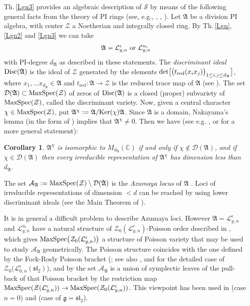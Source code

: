 \documentclass[11pt]{amsart}
\newtheorem{cor}[teo]{Corollary}
\newcommand{\e}{\epsilon}
\newcommand{\mc}{\mathbb{C}}
\newcommand{\Ll}{\mathcal{L}}
\newcommand{\Zz}{\mathcal{Z}}
\begin{document}
Th.\,\ref{Lgn3} provides an algebraic description of $\mathcal{S}$ by means of the following general facts from the theory of PI rings (see, e.g., \cite[Chap.\,13]{MC-R}, \cite[Chap.\,6]{Rowen}, \cite{Artin}). Let $\mathfrak{A}$ be a division PI algebra, with center $\Zz$ a Noetherian and integrally closed ring. By Th.\,\ref{Lgn}, \ref{Lgn2} and \ref{Lgn3} we can take
$$\mathfrak{A} = \Ll_{g,n}^\e\ {\rm or}\ \Ll_{g,n}^{u_\e}$$ with PI-degree $d_\mathfrak{A}$ as described in these statements. The {\it discriminant ideal} ${\rm Disc}(\mathfrak{A})$ is the ideal of $\Zz$ generated by the elements ${\rm det}\bigl[\bigl(t_{\mathrm{red}}(x_ix_j)\bigr)_{1\leq i,j\leq d_\mathfrak{A}}\bigr]$, where $x_1,\ldots x_{d_\mathfrak{A}}\in \mathfrak{A}$ and $t_{\mathrm{red}}: \mathfrak{A} \rightarrow \Zz$ is the reduced trace map of $\mathfrak{A}$ (see \cite[\S 10]{Reiner}). The set $\mathcal{D}(\mathfrak{A}) \subset {\rm MaxSpec}(\Zz)$ of zeros of ${\rm Disc}(\mathfrak{A})$ is a closed (proper) subvariety of ${\rm MaxSpec}(\Zz)$, called the discriminant variety. Now, given a central character $\chi\in {\rm MaxSpec}(\Zz)$, put $\mathfrak{A}^\chi := \mathfrak{A}/{\rm Ker}(\chi)\mathfrak{A}$. Since $\mathfrak{A}$ is a domain, Nakayama's lemma (in the form of \cite[Cor.\,2.5]{AMacD}) implies that $\mathfrak{A}^\chi\ne 0$. Then we have (see e.g. \cite[Lem.\,3.7]{DCK}, or \cite[Th.\,I.13.5]{BG} for a more general statement):
\begin{cor}\label{disAz} $\mathfrak{A}^\chi$ is isomorphic to $M_{d_\mathfrak{A}}(\mc)$ if and only if $\chi\notin \mathcal{D}(\mathfrak{A})$, and if $\chi\in \mathcal{D}(\mathfrak{A})$ then every irreducible representation of $\mathfrak{A}^\chi$ has dimension less than ${d_\mathfrak{A}}$. 
\end{cor} 
The set $\mathcal{A}_{\mathfrak{A}} := {\rm MaxSpec}(\Zz)\setminus \mathcal{D}(\mathfrak{A})$ is the {\it Azumaya locus} of $\mathfrak{A}$ \cite[III.1.6-III.1.7]{BG}. Loci of irreducible representations of dimension $< d$ can be reached by using lower discriminant ideals (see the Main Theorem of \cite{BY}).

It is in general a difficult problem to describe Azumaya loci. However $\mathfrak{A} = \Ll_{g,n}^\e$ and $\Ll_{g,n}^{u_\e}$ have a natural structure of $\mathcal{Z}_0(\Ll_{g,n}^\e)$-Poisson order described in \cite[\S 2.1-2.2]{BrGo}, which gives ${\rm MaxSpec}\bigl(\Zz_0(\Ll_{g,n}^\e)\bigr)$ a structure of Poisson variety that may be used to study $\mathcal{A}_{\mathfrak{A}}$ geometrically. The Poisson structure coincides with the one defined by the Fock-Rosly Poisson bracket (\cite{Frolov}; see also \cite[Prop. 4.3]{GJS}, and \cite{BR1} for the detailed case of $\mathcal{Z}_0(\Ll_{0,n}^\e(\mathfrak{sl}_2)$), and by \cite[Th.\,4.2]{BrGo} the set $\mathcal{A}_{\mathfrak{A}}$ is a union of symplectic leaves of the pull-back of that Poisson bracket by the restriction map ${\rm MaxSpec}(\Zz(\Ll_{g,n}^\e))\to {\rm MaxSpec}(\Zz_0(\Ll_{g,n}^\e))$. This viewpoint has been used in \cite{GJS} (case $n=0$) and \cite{KaruoKorinman} (case of $\mathfrak{g}=\mathfrak{sl}_2$).
\end{document}
